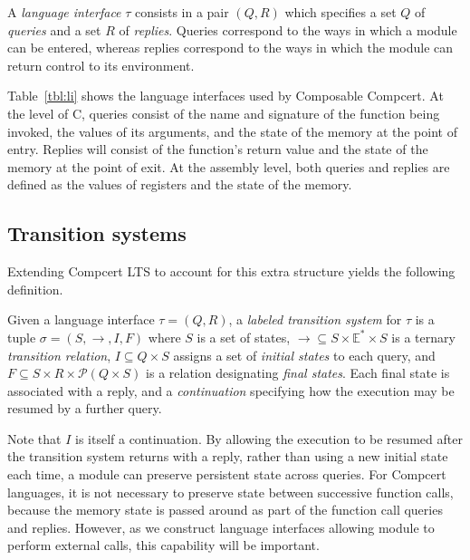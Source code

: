 \begin{definition}
A \emph{language interface} $\tau$ consists in a pair $(Q, R)$
which specifies
a set $Q$ of \emph{queries} and
a set $R$ of \emph{replies}.
Queries
correspond to the ways in which
a module can be entered, whereas
replies
correspond to the ways in which
the module can return control
to its environment.
\end{definition}

Table~\ref{tbl:li}
shows the language interfaces used by Composable Compcert.
At the level of C,
queries consist of
the name and signature of the function being invoked,
the values of its arguments,
and the state of the memory at the point of entry.
Replies
will consist of the function's return value
and the state of the memory at the point of exit.
At the assembly level,
both queries and replies are defined as
the values of registers and the state of the memory.


\subsection{Transition systems} %

Extending Compcert LTS to account for
this extra structure yields the following definition.

\begin{definition}
Given a language interface $\tau = (Q, R)$,
a \emph{labeled transition system} for $\tau$
is a tuple $\sigma = (S, \rightarrow, I, F)$ where
$S$ is a set of states,
${\rightarrow} \subseteq S \times \mathbb{E}^* \times S$
is a ternary \emph{transition relation},
$I \subseteq Q \times S$
assigns a set of \emph{initial states} to each query, and
$F \subseteq S \times R \times \mathcal{P}(Q \times S)$
is a relation designating \emph{final states}.
Each final state is associated with a reply,
and a \emph{continuation} specifying
how the execution may be resumed by a further query.
\end{definition}

Note that $I$ is itself a continuation.
By allowing the execution to be resumed
after the transition system returns with a reply,
rather than using a new initial state each time,
a module can preserve persistent state across queries.
For Compcert languages,
it is not necessary to preserve state between successive function calls,
because the memory state is passed around
as part of the function call queries and replies.
However,
as we construct language interfaces
allowing module to perform external calls,
this capability will be important.

